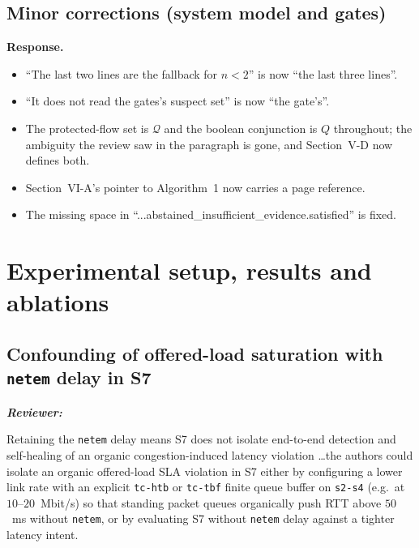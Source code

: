 \documentclass[11pt,a4paper]{article}
\newenvironment{reviewer}{\par\medskip\noindent\begin{minipage}{\linewidth}\small\itshape\color{quote}\textbf{Reviewer:}\par}{\end{minipage}\medskip\par}
\newenvironment{response}{\par\noindent\begin{minipage}{\linewidth}\small\textbf{Response.}\par}{\end{minipage}\medskip\par}
\begin{document}
\subsection{Minor corrections (system model and gates)}

\begin{response}
\begin{itemize}
  \item ``The last two lines are the fallback for $n<2$'' is now ``the
    last three lines''.
  \item ``It does not read the gates's suspect set'' is now ``the gate's''.
  \item The protected-flow set is $\mathcal{Q}$ and the boolean conjunction
    is $Q$ throughout; the ambiguity the review saw in the paragraph is
    gone, and Section~V-D now defines both.
  \item Section~VI-A's pointer to Algorithm~1 now carries a page
    reference.
  \item The missing space in ``...abstained\_insufficient\_evidence.satisfied''
    is fixed.
\end{itemize}
\end{response}

\section{Experimental setup, results and ablations}

\subsection{Confounding of offered-load saturation with \texttt{netem} delay
in S7}

\begin{reviewer}
Retaining the \texttt{netem} delay means S7 does not isolate end-to-end
detection and self-healing of an organic congestion-induced latency
violation \dots the authors could isolate an organic offered-load SLA
violation in S7 either by configuring a lower link rate with an explicit
\texttt{tc-htb} or \texttt{tc-tbf} finite queue buffer on \texttt{s2-s4}
(e.g.\ at $10$--$20$~Mbit/s) so that standing packet queues organically push
RTT above $50$~ms without \texttt{netem}, or by evaluating S7 without
\texttt{netem} delay against a tighter latency intent.
\end{reviewer}
\end{document}
